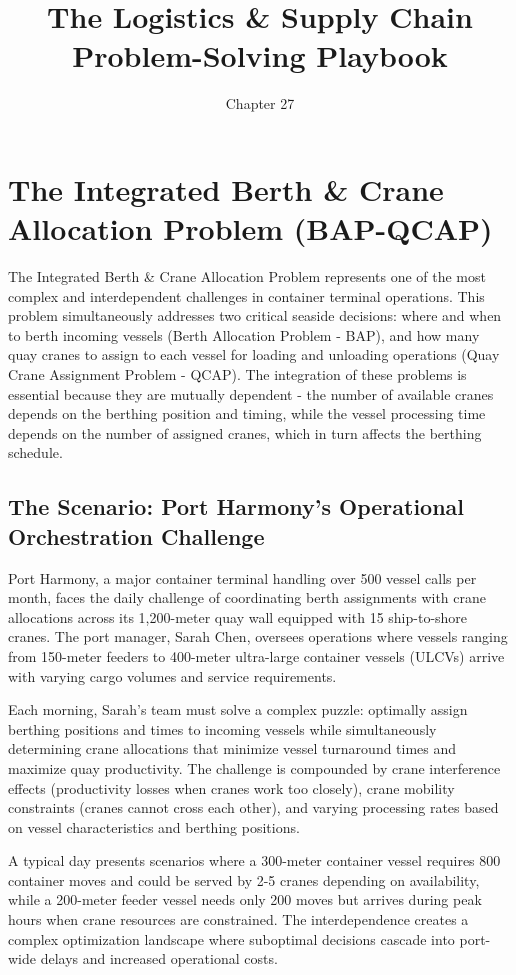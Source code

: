 \documentclass{article}
\title{The Logistics \& Supply Chain Problem-Solving Playbook}
\author{Chapter 27}
\date{}
\begin{document}
\maketitle

\section{The Integrated Berth \& Crane Allocation Problem (BAP-QCAP)}

The Integrated Berth \& Crane Allocation Problem represents one of the most complex and interdependent challenges in container terminal operations. This problem simultaneously addresses two critical seaside decisions: where and when to berth incoming vessels (Berth Allocation Problem - BAP), and how many quay cranes to assign to each vessel for loading and unloading operations (Quay Crane Assignment Problem - QCAP). The integration of these problems is essential because they are mutually dependent - the number of available cranes depends on the berthing position and timing, while the vessel processing time depends on the number of assigned cranes, which in turn affects the berthing schedule.

\subsection{The Scenario: Port Harmony's Operational Orchestration Challenge}

Port Harmony, a major container terminal handling over 500 vessel calls per month, faces the daily challenge of coordinating berth assignments with crane allocations across its 1,200-meter quay wall equipped with 15 ship-to-shore cranes. The port manager, Sarah Chen, oversees operations where vessels ranging from 150-meter feeders to 400-meter ultra-large container vessels (ULCVs) arrive with varying cargo volumes and service requirements.

Each morning, Sarah's team must solve a complex puzzle: optimally assign berthing positions and times to incoming vessels while simultaneously determining crane allocations that minimize vessel turnaround times and maximize quay productivity. The challenge is compounded by crane interference effects (productivity losses when cranes work too closely), crane mobility constraints (cranes cannot cross each other), and varying processing rates based on vessel characteristics and berthing positions.

A typical day presents scenarios where a 300-meter container vessel requires 800 container moves and could be served by 2-5 cranes depending on availability, while a 200-meter feeder vessel needs only 200 moves but arrives during peak hours when crane resources are constrained. The interdependence creates a complex optimization landscape where suboptimal decisions cascade into port-wide delays and increased operational costs.
\end{document}
